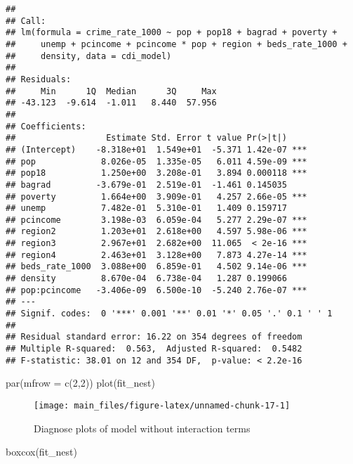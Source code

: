 \documentclass[
  11pt,
]{article}
\newenvironment{Shaded}{\begin{snugshade}}{\end{snugshade}}
\newcommand{\AttributeTok}[1]{\textcolor[rgb]{0.77,0.63,0.00}{#1}}
\newcommand{\DecValTok}[1]{\textcolor[rgb]{0.00,0.00,0.81}{#1}}
\newcommand{\FunctionTok}[1]{\textcolor[rgb]{0.00,0.00,0.00}{#1}}
\newcommand{\NormalTok}[1]{#1}
\begin{document}
\begin{verbatim}
## 
## Call:
## lm(formula = crime_rate_1000 ~ pop + pop18 + bagrad + poverty + 
##     unemp + pcincome + pcincome * pop + region + beds_rate_1000 + 
##     density, data = cdi_model)
## 
## Residuals:
##     Min      1Q  Median      3Q     Max 
## -43.123  -9.614  -1.011   8.440  57.956 
## 
## Coefficients:
##                  Estimate Std. Error t value Pr(>|t|)    
## (Intercept)    -8.318e+01  1.549e+01  -5.371 1.42e-07 ***
## pop             8.026e-05  1.335e-05   6.011 4.59e-09 ***
## pop18           1.250e+00  3.208e-01   3.894 0.000118 ***
## bagrad         -3.679e-01  2.519e-01  -1.461 0.145035    
## poverty         1.664e+00  3.909e-01   4.257 2.66e-05 ***
## unemp           7.482e-01  5.310e-01   1.409 0.159717    
## pcincome        3.198e-03  6.059e-04   5.277 2.29e-07 ***
## region2         1.203e+01  2.618e+00   4.597 5.98e-06 ***
## region3         2.967e+01  2.682e+00  11.065  < 2e-16 ***
## region4         2.463e+01  3.128e+00   7.873 4.27e-14 ***
## beds_rate_1000  3.088e+00  6.859e-01   4.502 9.14e-06 ***
## density         8.670e-04  6.738e-04   1.287 0.199066    
## pop:pcincome   -3.406e-09  6.500e-10  -5.240 2.76e-07 ***
## ---
## Signif. codes:  0 '***' 0.001 '**' 0.01 '*' 0.05 '.' 0.1 ' ' 1
## 
## Residual standard error: 16.22 on 354 degrees of freedom
## Multiple R-squared:  0.563,  Adjusted R-squared:  0.5482 
## F-statistic: 38.01 on 12 and 354 DF,  p-value: < 2.2e-16
\end{verbatim}

\begin{Shaded}
\begin{Highlighting}[]
\FunctionTok{par}\NormalTok{(}\AttributeTok{mfrow =} \FunctionTok{c}\NormalTok{(}\DecValTok{2}\NormalTok{,}\DecValTok{2}\NormalTok{))}
\FunctionTok{plot}\NormalTok{(fit\_nest)}
\end{Highlighting}
\end{Shaded}

\begin{figure}
\texttt{[image: main\_files/figure-latex/unnamed-chunk-17-1]} \caption{\label{fig:figs}Diagnose plots of model without interaction terms}\label{fig:unnamed-chunk-17}
\end{figure}

\begin{Shaded}
\begin{Highlighting}[]
\FunctionTok{boxcox}\NormalTok{(fit\_nest)}
\end{Highlighting}
\end{Shaded}
\end{document}
